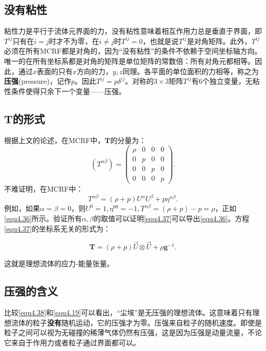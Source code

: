 \subsection*{没有粘性}
粘性力是平行于流体元界面的力，没有粘性意味着相互作用力总是垂直于界面，即$T^{ij}$只有在$i = j$时才不为零，在$i \neq j$时$T^{ij} = 0$，也就是说$T^{ij}$是对角矩阵。此外，$T^{ij}$必须在所有MCRF都是对角的，因为“没有粘性”的条件不依赖于空间坐标轴方向。唯一的在所有坐标系都是对角的矩阵是单位矩阵的常数倍：所有对角元都相等。因此，通过$x$表面的只有$x$方向的力，$y, z$同理。各平面的单位面积的力相等，称之为\textbf{压强}(pressure)，记作$p$。因此$T^{ij} = p \delta^{ij}$。对称的$3 \times 3$矩阵$T^{ij}$有6个独立变量，无粘性条件使得只余下一个变量——压强。


\subsection*{$\mathbf{T}$的形式}
根据上文的论述，在MCRF中，$\mathbf{T}$的分量为：
\begin{equation}
    (T^{\alpha \beta}) = 
    \begin{pmatrix}
        \rho & 0 & 0 & 0 \\
        0 & p & 0 & 0 \\
        0 & 0 & p & 0 \\
        0 & 0 & 0 & p
    \end{pmatrix}.
\label{equ4.36}
\end{equation}
不难证明，在MCRF中：
\begin{equation}
    T^{\alpha \beta} = (\rho + p) U^\alpha U^\beta + p\eta^{\alpha \beta}.
\label{equ4.37}
\end{equation}
例如，如果$\alpha = \beta = 0$，则$U^0 = 1, \eta^{00} = -1, T^{\alpha \beta} = (\rho + p) - p = \rho$，正如\eqref{equ4.36}所示。验证所有$\alpha, \beta$的取值可以证明\eqref{equ4.37}可以导出\eqref{equ4.36}。方程\eqref{equ4.37}的坐标系无关的形式为：
\begin{shaded}
\begin{equation}
    \mathbf{T} = (\rho + p) \vec{U} \otimes \vec{U} + \rho \mathbf{g}^{-1}.
\label{equ4.38}
\end{equation}
\end{shaded}
这就是理想流体的应力-能量张量。

\subsection*{压强的含义}
比较\eqref{equ4.38}和\eqref{equ4.19}可以看出，“尘埃”是无压强的理想流体。这意味着只有理想流体的粒子\textbf{没有}随机运动，它的压强才为零。压强来自粒子的随机速度。即使是粒子之间可以视为无碰撞的稀薄气体仍然有压强，这是因为压强是动量流量，不论它来自于作用力或者粒子通过界面都可以。

